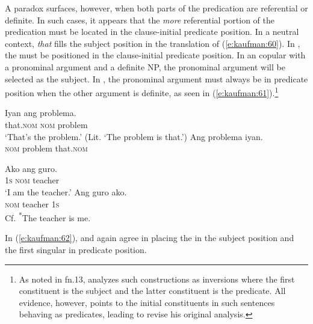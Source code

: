 \documentclass[output=paper]{langsci/langscibook}
\begin{document}
\noindent
A paradox surfaces, however, when both parts of the predication are referential or definite. In such cases, it appears that the \emph{more} referential portion of the predication must be located in the clause-initial  predicate position. In a neutral context, \textit{that} fills the subject position in the  translation of (\ref{e:kaufman:60}). In , the  must be positioned in the clause-initial predicate position. In an  copular  with a pronominal argument and a definite NP, the pronominal argument will be selected as the subject. In , the pronominal argument must always be in predicate position when the other argument is definite, as seen in (\ref{e:kaufman:61}).\footnote{As noted in fn.13, \citet[148--149]{Kroeger:1993} analyzes such constructions as inversions where the first constituent is the subject and the latter constituent is the predicate. All evidence, however, points to the initial constituents in such sentences behaving as predicates, leading \citet{Kroeger:2009} to revise his original analysis.}

\begin{exe}
	\ex\label{e:kaufman:60}
	\begin{xlist}
		\ex\label{e:kaufman:60a}
        \gll Iyan ang problema.\\
		that.\textsc{nom} \textsc{nom} problem\\
		\glt `That's the problem.' (Lit. `The problem is that.')
		\ex\label{e:kaufman:60b}
        \gll {\USStar}Ang problema iyan.\\
		\phantom{*}\textsc{nom} problem that.\textsc{nom}\\
	\end{xlist}
\end{exe}

\begin{exe}
	\ex\label{e:kaufman:61}
	\begin{xlist}
		\ex\label{e:kaufman:61a}
        \gll Ako ang guro.\\
		\textsc{1s} \textsc{nom} teacher\\
		\glt `I am the teacher.'
		\ex\label{e:kaufman:61b}
        \gll {\USStar}Ang guro ako.\\
		\phantom{*}\textsc{nom} teacher \textsc{1s}\\
		Cf. \textsuperscript{*}The teacher is me.
	\end{xlist}
\end{exe}

\noindent
In (\ref{e:kaufman:62}),  and  again agree in placing the  in the subject position and the first singular  in predicate position. 
\end{document}
